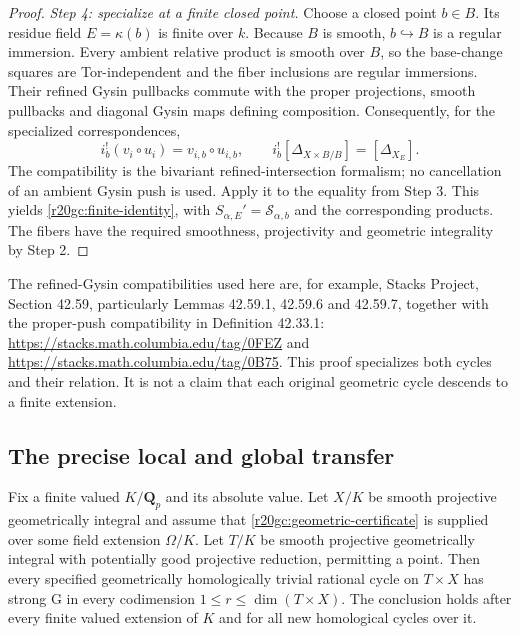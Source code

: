 \begin{proof}
\emph{Step 4: specialize at a finite closed point.}
Choose a closed point $b\in B$.  Its residue field $E=\kappa(b)$
is finite over $k$.  Because $B$ is smooth, $b\hookrightarrow B$
is a regular immersion.  Every ambient relative product is
smooth over $B$, so the base-change squares are Tor-independent
and the fiber inclusions are regular immersions.  Their refined
Gysin pullbacks commute with the proper projections, smooth
pullbacks and diagonal Gysin maps defining composition.
Consequently, for the specialized correspondences,
\[
 i_b^!(v_i\circ u_i)=v_{i,b}\circ u_{i,b},\qquad
 i_b^![\Delta_{X\times B/B}]=[\Delta_{X_E}].
 \tag{GC20.3}\label{r20gc:composition-specializes}
\]
The compatibility is the bivariant refined-intersection
formalism; no cancellation of an ambient Gysin push is used.
Apply it to the equality from Step 3.  This yields
\eqref{r20gc:finite-identity}, with
$S_{\alpha,E}'=\mathcal S_{\alpha,b}$ and the corresponding
products.  The fibers have the required smoothness,
projectivity and geometric integrality by Step 2.
\end{proof}

The refined-Gysin compatibilities used here are, for example,
Stacks Project, Section 42.59, particularly Lemmas 42.59.1,
42.59.6 and 42.59.7, together with the proper-push compatibility
in Definition 42.33.1:
\url{https://stacks.math.columbia.edu/tag/0FEZ} and
\url{https://stacks.math.columbia.edu/tag/0B75}.
This proof specializes both cycles and their relation.  It is
not a claim that each original geometric cycle descends to a
finite extension.

\subsection{The precise local and global transfer}

\begin{theorem}
\label{r20gc:local}
Fix a finite valued $K/\mathbf Q_p$ and its absolute value.
Let $X/K$ be smooth projective geometrically integral and assume
that \eqref{r20gc:geometric-certificate} is supplied over some
field extension $\Omega/K$.  Let $T/K$ be smooth projective
geometrically integral with potentially good projective
reduction, permitting a point.  Then every specified geometrically
homologically trivial rational cycle on $T\times X$ has strong
G in every codimension $1\leq r\leq\dim(T\times X)$.
The conclusion holds after every finite valued extension of
$K$ and for all new homological cycles over it.
\end{theorem}

